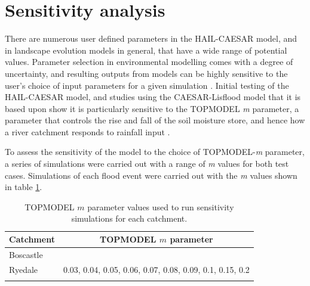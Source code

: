 %

\section{Sensitivity analysis}
There are numerous user defined parameters in the HAIL-CAESAR model, and in landscape evolution models in general, that have a wide range of potential values. Parameter selection in environmental modelling comes with a degree of uncertainty, and resulting outputs from models can be highly sensitive to the user's choice of input parameters for a given simulation \citep{Pelletier2012}. Initial testing of the HAIL-CAESAR model, and studies using the CAESAR-Lisflood model that it is based upon show it is particularly sensitive to the TOPMODEL \textit{m} parameter, a parameter that controls the rise and fall of the soil moisture store, and hence how a river catchment responds to rainfall input \citep{Beven1979}. 

To assess the sensitivity of the model to the choice of TOPMODEL-\textit{m} parameter, a series of simulations were carried out with a range of \textit{m} values for both test cases. Simulations of each flood event were carried out with the \textit{m} values shown in table \ref{table-m-sens}.

\begin{table}
\begin{tabular}{lc}
\textbf{Catchment} & \textbf{TOPMODEL \(m\) parameter} \\
\hline
Boscastle  &                                            \\
Ryedale     & 0.03, 0.04, 0.05, 0.06, 0.07, 0.08, 0.09, 0.1, 0.15, 0.2  \\
\hline
\\ 
\end{tabular}
\caption{TOPMODEL \(m\) parameter values used to run sensitivity simulations for each catchment.}
\label{table-m-sens}
\end{table}

